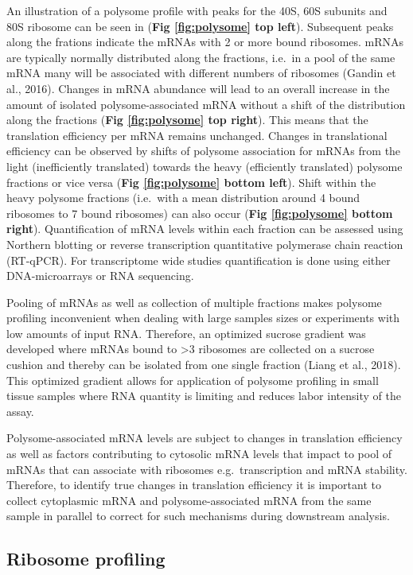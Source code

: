 \documentclass[
  12pt,
  openany]{book}
\begin{document}
An illustration of a polysome profile with peaks for the 40S, 60S subunits and 80S ribosome can be seen in (\textbf{Fig \ref{fig:polysome} top left}). Subsequent peaks along the frations indicate the mRNAs with 2 or more bound ribosomes. mRNAs are typically normally distributed along the fractions, i.e.~in a pool of the same mRNA many will be associated with different numbers of ribosomes (Gandin et al., 2016). Changes in mRNA abundance will lead to an overall increase in the amount of isolated polysome-associated mRNA without a shift of the distribution along the fractions (\textbf{Fig \ref{fig:polysome} top right}). This means that the translation efficiency per mRNA remains unchanged. Changes in translational efficiency can be observed by shifts of polysome association for mRNAs from the light (inefficiently translated) towards the heavy (efficiently translated) polysome fractions or vice versa (\textbf{Fig \ref{fig:polysome} bottom left}). Shift within the heavy polysome fractions (i.e.~with a mean distribution around 4 bound ribosomes to 7 bound ribosomes) can also occur (\textbf{Fig \ref{fig:polysome} bottom right}). Quantification of mRNA levels within each fraction can be assessed using Northern blotting or reverse transcription quantitative polymerase chain reaction (RT-qPCR). For transcriptome wide studies quantification is done using either DNA-microarrays or RNA sequencing.

Pooling of mRNAs as well as collection of multiple fractions makes polysome profiling inconvenient when dealing with large samples sizes or experiments with low amounts of input RNA. Therefore, an optimized sucrose gradient was developed where mRNAs bound to \textgreater3 ribosomes are collected on a sucrose cushion and thereby can be isolated from one single fraction (Liang et al., 2018). This optimized gradient allows for application of polysome profiling in small tissue samples where RNA quantity is limiting and reduces labor intensity of the assay.

Polysome-associated mRNA levels are subject to changes in translation efficiency as well as factors contributing to cytosolic mRNA levels that impact to pool of mRNAs that can associate with ribosomes e.g.~transcription and mRNA stability. Therefore, to identify true changes in translation efficiency it is important to collect cytoplasmic mRNA and polysome-associated mRNA from the same sample in parallel to correct for such mechanisms during downstream analysis.

\subsection{Ribosome profiling} \label{riboseq}
\end{document}
